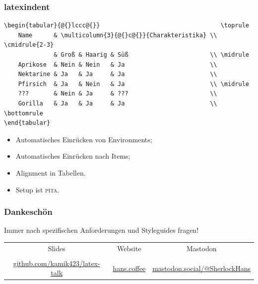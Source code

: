 \documentclass[aspectratio=169, 10pt]{beamer}
\makeatletter
\def\beamer@writeslidentry@miniframesoff{%
    \expandafter\beamer@ifempty\expandafter{\beamer@framestartpage}{}%
    {%
        \clearpage\beamer@notesactions%
    }
}
\newcommand*{\miniframesoff}{\let\beamer@writeslidentry=\beamer@writeslidentry@miniframesoff}
\makeatother
\begin{document}
\begin{frame}[fragile]
    \frametitle{latexindent}
    \begin{lstlisting}[basicstyle=\ttfamily\scriptsize]
\begin{tabular}{@{}lccc@{}}                                  \toprule
    Name      & \multicolumn{3}{@{}c@{}}{Charakteristika} \\ \cmidrule{2-3}
              & Groß & Haarig & Süß                       \\ \midrule
    Aprikose  & Nein & Nein   & Ja                        \\
    Nektarine & Ja   & Ja     & Ja                        \\
    Pfirsich  & Ja   & Nein   & Ja                        \\ \midrule
    ???       & Nein & Ja     & ???                       \\
    Gorilla   & Ja   & Ja     & Ja                        \\ \bottomrule
\end{tabular}
    \end{lstlisting}
    \begin{itemize}
        \item Automatisches Einrücken von Environments;
        \item Automatisches Einrücken nach Items;
        \item Alignment in Tabellen.
        \item Setup ist \textsc{pita}.
    \end{itemize}
\end{frame}

\appendix
\miniframesoff
\begin{frame}[fragile]
    \frametitle{Dankeschön}
    Immer nach spezifischen Anforderungen und Styleguides fragen!\\\vfill

    \pause

    \begin{tabularx}{\linewidth}{@{}CCC@{}}
        Slides                                                       & Website                                   & Mastodon                                                    \\
         &  &  \\
        \url{github.com/kamik423/latex-talk}                         & \url{hans.coffee}                         & \url{mastodon.social/@SherlockHans}                         \\
    \end{tabularx}

\end{frame}
\end{document}
